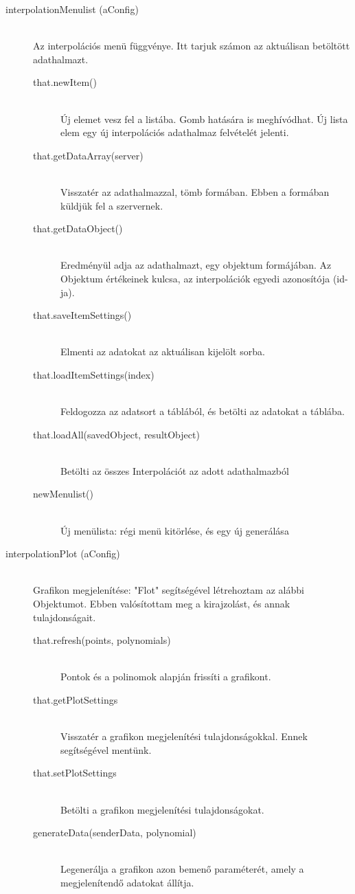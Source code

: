 \begin{description}
		\item[interpolationMenulist (aConfig)] 
			\hfill \\ 
			Az interpolációs menü függvénye. Itt tarjuk számon az aktuálisan betöltött adathalmazt.
			\begin{description}
			\item[that.newItem()] 
			\hfill \\ Új elemet vesz fel a listába. Gomb hatására is meghívódhat. \newline Új lista elem egy új interpolációs adathalmaz felvételét jelenti.  
			\item[that.getDataArray(server)] 
			\hfill \\ Visszatér az adathalmazzal, tömb formában. Ebben a formában küldjük fel a szervernek.
			\item[that.getDataObject()] 
			\hfill \\ Eredményül adja az adathalmazt, egy objektum formájában. Az Objektum értékeinek kulcsa, az interpolációk egyedi azonosítója (id-ja).
			\item[that.saveItemSettings()] 
			\hfill \\ Elmenti az adatokat az aktuálisan kijelölt sorba.
			\item[that.loadItemSettings(index)]
			\hfill \\ Feldogozza az adatsort a táblából, és betölti az adatokat a táblába.
			\item[that.loadAll(savedObject, resultObject)] 
			\hfill \\Betölti az összes Interpolációt az adott adathalmazból
			\item[newMenulist()] 
			\hfill \\
			Új menülista: régi menü kitörlése, és egy új generálása
			\hfill \\ 
			\end{description}
		\item[interpolationPlot (aConfig)]
			\hfill \\ Grafikon megjelenítése: "Flot" segítségével létrehoztam az alábbi Objektumot. Ebben valósítottam meg a kirajzolást, és annak tulajdonságait.
			\begin{description}
			\item[that.refresh(points, polynomials)]
			\hfill \\ Pontok és a polinomok alapján frissíti a grafikont.
			\item[that.getPlotSettings]
			\hfill \\ Visszatér a grafikon megjelenítési tulajdonságokkal. Ennek segítségével mentünk.
			\item[that.setPlotSettings]
			\hfill \\ Betölti a grafikon megjelenítési tulajdonságokat.
			\item[generateData(senderData, polynomial)]
			\hfill \\ Legenerálja a grafikon azon bemenő paraméterét, amely a megjelenítendő adatokat állítja.


\end{description}
\end{description}
